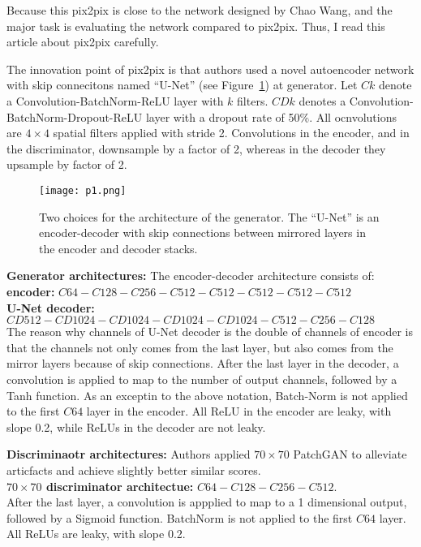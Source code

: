 \documentclass[a4paper]{article}
\begin{document}
Because this pix2pix is close to the network designed by Chao Wang, and the major task is evaluating the network compared to pix2pix. Thus, I read this article about pix2pix carefully. 

The innovation point of pix2pix is that authors used a novel autoencoder network with skip connecitons named ``U-Net'' (see Figure~\ref{fig1}) at generator. Let $Ck$ denote a Convolution-BatchNorm-ReLU layer with $k$ filters. $CDk$ denotes a Convolution-BatchNorm-Dropout-ReLU layer with a dropout rate of 50\%. All ocnvolutions are $4\times 4$ spatial filters applied with stride 2. Convolutions in the encoder, and in the discriminator, downsample by a factor of 2, whereas in the decoder they upsample by factor of 2.  

\begin{figure}[hb]
\begin{center}
\texttt{[image: p1.png]}
\end{center}
\caption{Two choices for the architecture of the generator. The ``U-Net'' is an encoder-decoder with skip connections between mirrored layers in the encoder and decoder stacks.} 
\label{fig1}
\end{figure}

{\bf Generator architectures:} The encoder-decoder architecture consists of:\\
{\bf encoder:} $C64-C128-C256-C512-C512-C512-C512-C512$\\
{\bf U-Net decoder:} $CD512-CD1024-CD1024-CD1024-CD1024-C512-C256-C128$\\
The reason why channels of U-Net decoder is the double of channels of encoder is that the channels not only comes from the last layer, but also comes from the mirror layers because of skip connections. After the last layer in the decoder, a convolution is applied to map to the number of output channels, followed by a Tanh function. As an exceptin to the above notation, Batch-Norm is not applied to the first $C64$ layer in the encoder. All ReLU in the encoder are leaky, with slope 0.2, while ReLUs in the decoder are not leaky.

{\bf Discriminaotr architectures:} Authors applied $70\times 70$ PatchGAN to alleviate articfacts and achieve slightly better similar scores. \\
{\bf $70 \times 70$ discriminator architectue:} $C64-C128-C256-C512$.\\
After the last layer, a convolution is appplied to map to a 1 dimensional output, followed by a Sigmoid function. BatchNorm is not applied to the first $C64$ layer. All ReLUs are leaky, with slope 0.2.
\end{document}
